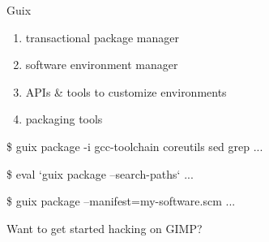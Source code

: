 \documentclass{beamer}
\begin{document}
\begin{frame}{Guix}
  \LARGE{
    \begin{enumerate}
    \item transactional package manager
    \item software environment manager
    \item APIs \& tools to customize environments
    \item packaging tools
    \end{enumerate}
  }
\end{frame}

\begin{frame}[fragile]

  \begin{semiverbatim}
\$ guix package -i gcc-toolchain coreutils sed grep
\textrm{...}

\$ eval `guix package --search-paths`
\textrm{...}

\$ guix package --manifest=my-software.scm
\textrm{...}
  \end{semiverbatim}

\end{frame}

\begin{frame}[fragile]
  \Huge{Want to get started hacking on GIMP?}
  \\[2cm]
\end{frame}
\end{document}

